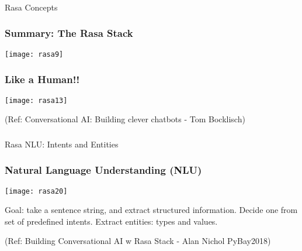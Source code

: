\begin{frame}[fragile]\frametitle{}
\begin{center}
{\Large Rasa Concepts}

\end{center}
\end{frame}

 \begin{frame}[fragile]\frametitle{Summary: The Rasa Stack}

\begin{center}
\texttt{[image: rasa9]}
\end{center}



\end{frame}


\begin{frame}[fragile]\frametitle{Like a Human!!}


\begin{center}
\texttt{[image: rasa13]}
\end{center}


{\tiny (Ref: Conversational AI: Building clever chatbots - Tom Bocklisch)}

\end{frame}

\begin{frame}[fragile]\frametitle{}
\begin{center}

{\Large Rasa NLU: Intents and Entities}

\end{center}
\end{frame}

\begin{frame}[fragile]\frametitle{Natural Language Understanding (NLU)}


\begin{center}
\texttt{[image: rasa20]}
\end{center}

Goal: take a sentence string, and extract structured information. Decide one from set of predefined intents. Extract entities: types and values.

{\tiny (Ref: Building Conversational AI w Rasa Stack - Alan Nichol  PyBay2018)}

\end{frame}

